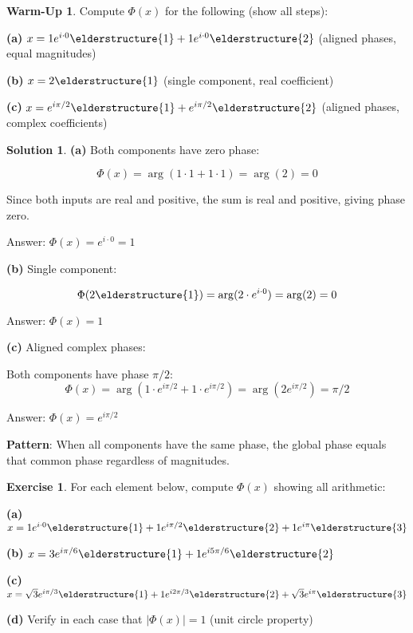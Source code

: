 \documentclass[12pt,a4paper]{book}
\theoremstyle{definition}
\newtheorem{exercise}{Exercise}[section]
\newtheorem{warmup}{Warm-Up}[section]
\newtheorem{solution}{Solution}[section]
\theoremstyle{remark}
\begin{document}
\begin{warmup}
Compute $\Phi(x)$ for the following (show all steps):

\textbf{(a)} $x = 1e^{i \cdot 0} \elderstructure{1} + 1e^{i \cdot 0} \elderstructure{2}$ (aligned phases, equal magnitudes)

\textbf{(b)} $x = 2\elderstructure{1}$ (single component, real coefficient)

\textbf{(c)} $x = e^{i\pi/2} \elderstructure{1} + e^{i\pi/2} \elderstructure{2}$ (aligned phases, complex coefficients)
\end{warmup}

\begin{solution}
\textbf{(a)} Both components have zero phase:

$$\Phi(x) = \arg(1 \cdot 1 + 1 \cdot 1) = \arg(2) = 0$$

Since both inputs are real and positive, the sum is real and positive, giving phase zero.

Answer: $\Phi(x) = e^{i \cdot 0} = 1$

\textbf{(b)} Single component:

$$\Phi(2\elderstructure{1}) = \arg(2 \cdot e^{i \cdot 0}) = \arg(2) = 0$$

Answer: $\Phi(x) = 1$

\textbf{(c)} Aligned complex phases:

Both components have phase $\pi/2$:
$$\Phi(x) = \arg(1 \cdot e^{i\pi/2} + 1 \cdot e^{i\pi/2}) = \arg(2e^{i\pi/2}) = \pi/2$$

Answer: $\Phi(x) = e^{i\pi/2}$

\textbf{Pattern}: When all components have the same phase, the global phase equals that common phase regardless of magnitudes.
\end{solution}

\begin{exercise}
For each element below, compute $\Phi(x)$ showing all arithmetic:

\textbf{(a)} $x = 1e^{i \cdot 0} \elderstructure{1} + 1e^{i\pi/2} \elderstructure{2} + 1e^{i\pi} \elderstructure{3}$

\textbf{(b)} $x = 3e^{i\pi/6} \elderstructure{1} + 1e^{i5\pi/6} \elderstructure{2}$

\textbf{(c)} $x = \sqrt{3}e^{i\pi/3} \elderstructure{1} + 1e^{i2\pi/3} \elderstructure{2} + \sqrt{3}e^{i\pi} \elderstructure{3}$

\textbf{(d)} Verify in each case that $|\Phi(x)| = 1$ (unit circle property)
\end{exercise}
\end{document}
